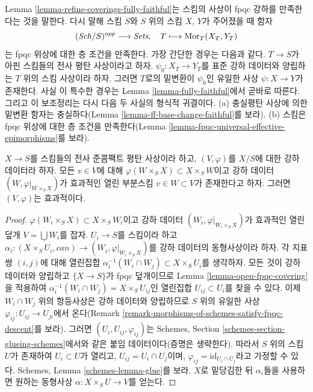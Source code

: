 \begin{remark}
\label{remark-morphisms-of-schemes-satisfy-fpqc-descent}
Lemma \ref{lemma-refine-coverings-fully-faithful}는 스킴의 사상이 fpqc
강하를 만족한다는 것을 말한다. 다시 말해 스킴 $S$와 $S$ 위의 스킴
$X$, $Y$가 주어졌을 때 함자
$$
(\mathit{Sch}/S)^{opp} \longrightarrow \textit{Sets},
\quad
T \longmapsto \mathop{\mathrm{Mor}}\nolimits_T(X_T, Y_T)
$$
는 fpqc 위상에 대한 층 조건을 만족한다. 가장 간단한 경우는 다음과
같다. $T \to S$가 아핀 스킴들의 전사 평탄 사상이라고 하자.
$\psi_0 : X_T \to Y_T$를 표준 강하 데이터와 양립하는 $T$ 위의 스킴
사상이라 하자. 그러면 $T$로의 밑변환이 $\psi_0$인 유일한 사상
$\psi : X \to Y$가 존재한다. 사실 이 특수한 경우는 Lemma
\ref{lemma-fully-faithful}에서 곧바로 따른다. 그리고 이 보조정리는 다시
다음 두 사실의 형식적 귀결이다. (a) 충실평탄 사상에 의한 밑변환 함자는
충실하다(Lemma \ref{lemma-ff-base-change-faithful}를 보라). (b) 스킴은
fpqc 위상에 대한 층 조건을 만족한다(Lemma
\ref{lemma-fpqc-universal-effective-epimorphisms}를 보라).
\end{remark}

\begin{lemma}
\label{lemma-effective-for-fpqc-is-local-upstairs}
$X \to S$를 스킴들의 전사 준콤팩트 평탄 사상이라 하고,
$(V, \varphi)$를 $X/S$에 대한 강하 데이터라 하자. 모든 $v \in V$에
대해 $\varphi(W \times_S X) \subset X \times_S W$이고 강하 데이터
$(W, \varphi|_{W \times_S X})$가 효과적인 열린 부분스킴
$v \in W \subset V$가 존재한다고 하자. 그러면 $(V, \varphi)$는
효과적이다.
\end{lemma}

\begin{proof}
$\varphi(W_i \times_S X) \subset X \times_S W_i$이고 강하 데이터
$(W_i, \varphi|_{W_i \times_S X})$가 효과적인 열린 덮개
$V = \bigcup W_i$를 잡자. $U_i \to S$를 스킴이라 하고
$\alpha_i : (X \times_S U_i, can) \to (W_i, \varphi|_{W_i \times_S X})$를
강하 데이터의 동형사상이라 하자. 각 지표쌍 $(i, j)$에 대해 열린집합
$\alpha_i^{-1}(W_i \cap W_j) \subset X \times_S U_i$를 생각하자. 모든
것이 강하 데이터와 양립하고 $\{X \to S\}$가 fpqc 덮개이므로 Lemma
\ref{lemma-open-fpqc-covering}을 적용하여
$\alpha_i^{-1}(W_i \cap W_j) = X \times_S U_{ij}$인 열린집합
$U_{ij} \subset U_i$를 찾을 수 있다. 이제 $W_i \cap W_j$ 위의 항등사상은
강하 데이터와 양립하므로 $S$ 위의 유일한 사상
$\varphi_{ij} : U_{ij} \to U_{ji}$에서 온다(Remark
\ref{remark-morphisms-of-schemes-satisfy-fpqc-descent}를 보라). 그러면
$(U_i, U_{ij}, \varphi_{ij})$는 Schemes, Section
\ref{schemes-section-glueing-schemes}에서와 같은 붙임 데이터이다(증명은
생략한다). 따라서 $S$ 위의 스킴 $U$가 존재하여 $U_i \subset U$가
열리고, $U_{ij} = U_i \cap U_j$이며,
$\varphi_{ij} = \text{id}_{U_i \cap U_j}$라고 가정할 수 있다. Schemes,
Lemma \ref{schemes-lemma-glue}를 보라. $X$로 밑당김한 뒤 $\alpha_i$들을
사용하면 원하는 동형사상 $\alpha : X \times_S U \to V$를 얻는다.
\end{proof}







